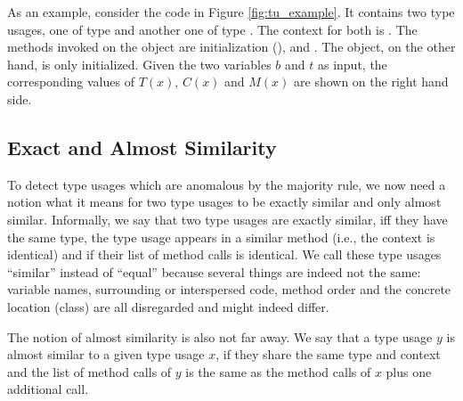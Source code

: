 As an example, consider the code in Figure \ref{fig:tu_example}.
It contains two type usages, one of type  and another one of type .
The context for both is .
The methods invoked on the  object are initialization (),  and .
The  object, on the other hand, is only initialized.
Given the two variables $b$ and $t$ as input, the corresponding values of $T(x)$, $C(x)$ and $M(x)$ are shown on the right hand side.

\subsection{Exact and Almost Similarity}


To detect type usages which are anomalous by the majority rule, we now need a notion what it means for two type usages to be exactly similar and only almost similar.
Informally, we say that two type usages are exactly similar, iff they have the same type, the type usage appears in a similar method (i.e., the context is identical) and if their list of method calls is identical.
We call these type usages ``similar'' instead of ``equal'' because several things are indeed not the same: variable names, surrounding or interspersed code, method order and the concrete location (class) are all disregarded and might indeed differ.

The notion of almost similarity is also not far away.
We say that a type usage $y$ is almost similar to a given type usage $x$, if they share the same type and context and the list of method calls of $y$ is the same as the method calls of $x$ plus one additional call.

